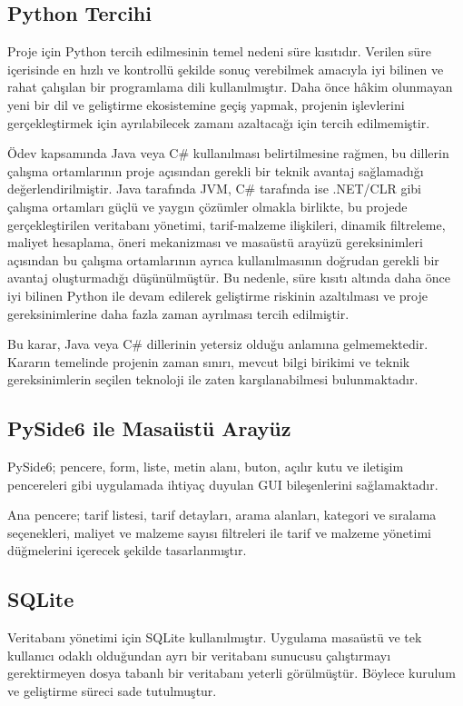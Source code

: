 \documentclass[conference]{IEEEtran}
\begin{document}
\subsection{Python Tercihi}
Proje için Python tercih edilmesinin temel nedeni süre kısıtıdır. Verilen süre içerisinde en hızlı ve kontrollü şekilde sonuç verebilmek amacıyla iyi bilinen ve rahat çalışılan bir programlama dili kullanılmıştır. Daha önce hâkim olunmayan yeni bir dil ve geliştirme ekosistemine geçiş yapmak, projenin işlevlerini gerçekleştirmek için ayrılabilecek zamanı azaltacağı için tercih edilmemiştir.

Ödev kapsamında Java veya C\# kullanılması belirtilmesine rağmen, bu dillerin çalışma ortamlarının proje açısından gerekli bir teknik avantaj sağlamadığı değerlendirilmiştir. Java tarafında JVM, C\# tarafında ise .NET/CLR gibi çalışma ortamları güçlü ve yaygın çözümler olmakla birlikte, bu projede gerçekleştirilen veritabanı yönetimi, tarif-malzeme ilişkileri, dinamik filtreleme, maliyet hesaplama, öneri mekanizması ve masaüstü arayüzü gereksinimleri açısından bu çalışma ortamlarının ayrıca kullanılmasının doğrudan gerekli bir avantaj oluşturmadığı düşünülmüştür. Bu nedenle, süre kısıtı altında daha önce iyi bilinen Python ile devam edilerek geliştirme riskinin azaltılması ve proje gereksinimlerine daha fazla zaman ayrılması tercih edilmiştir.

Bu karar, Java veya C\# dillerinin yetersiz olduğu anlamına gelmemektedir. Kararın temelinde projenin zaman sınırı, mevcut bilgi birikimi ve teknik gereksinimlerin seçilen teknoloji ile zaten karşılanabilmesi bulunmaktadır.

\subsection{PySide6 ile Masaüstü Arayüz}
PySide6; pencere, form, liste, metin alanı, buton, açılır kutu ve iletişim pencereleri gibi uygulamada ihtiyaç duyulan GUI bileşenlerini sağlamaktadır.

Ana pencere; tarif listesi, tarif detayları, arama alanları, kategori ve sıralama seçenekleri, maliyet ve malzeme sayısı filtreleri ile tarif ve malzeme yönetimi düğmelerini içerecek şekilde tasarlanmıştır.

\subsection{SQLite}
Veritabanı yönetimi için SQLite kullanılmıştır. Uygulama masaüstü ve tek kullanıcı odaklı olduğundan ayrı bir veritabanı sunucusu çalıştırmayı gerektirmeyen dosya tabanlı bir veritabanı yeterli görülmüştür. Böylece kurulum ve geliştirme süreci sade tutulmuştur.
\end{document}
